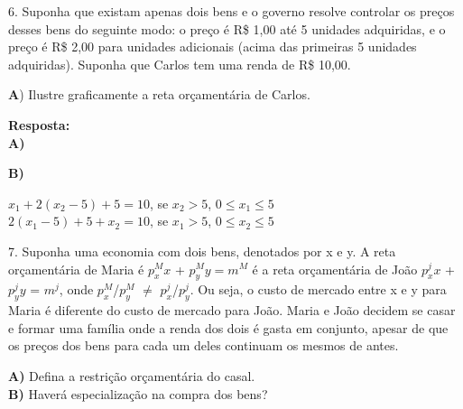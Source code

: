 \begin{flushleft}
6. Suponha que existam apenas dois bens e o governo resolve controlar os preços desses bens do seguinte modo: o preço é R\$ 1,00 até 5 unidades adquiridas, e o preço é R\$ 2,00 para unidades adicionais (acima das primeiras 5 unidades adquiridas). Suponha que Carlos tem uma renda de R\$ 10,00. \singlespacing

\textbf{A}) Ilustre graficamente a reta orçamentária de Carlos.

\textbf{Resposta:}
\\
\textbf{A)}
\begin{center}
					
					
\end{center}

\textbf{B)}
\\
\begin{center}

{$x_{1}+2(x_{2}-5)+5=10$}, se {$x_{2}>5$}, {$0\leq$}{$x_{1}$}{$\leq5$}\\
{$2(x_{1}-5)+5+x_{2}=10$}, se {$x_{1}>5$}, {$0\leq$}{$x_{2}$}{$\leq5$}
\end{center}

7. Suponha uma economia com dois bens, denotados por x e y. A reta orçamentária de Maria é $p_{x}^{M}\textit{x}$ + $p_{y}^{M}\textit{y} = m^{M}$ é a reta orçamentária de João $p_{x}^{j}\textit{x}$ + $p_{y}^{j}\textit{y}$ = $m^{j}$, onde $p_{x}^{M}$/$p_{y}^{M}$ $\neq$ $p_{x}^{j}$/$p_{y}^{j}$. Ou seja, o custo de mercado entre x e y para Maria é diferente do custo de mercado para João. Maria e João decidem se casar e formar uma família onde a renda dos dois é gasta em conjunto, apesar de que os preços dos bens para cada um deles continuam os mesmos de antes.  \singlespacing

\textbf{A)} Defina a restrição orçamentária do casal.
\\
\textbf{B)} Haverá especialização na compra dos bens? \singlespacing


\end{flushleft}
